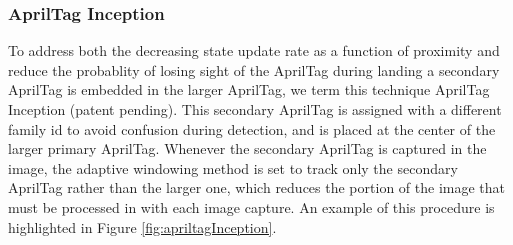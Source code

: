 \documentclass[11pt, twocolumn]{article}
\begin{document}
\subsubsection{AprilTag Inception}
To address both the decreasing state update rate as a function of proximity and reduce the probablity of losing sight of the AprilTag during landing a secondary AprilTag is embedded in the larger AprilTag, we term this technique AprilTag Inception (patent pending). This secondary AprilTag is assigned with a different family id to avoid confusion during detection, and is placed at the center of the larger primary AprilTag. Whenever the secondary AprilTag is captured in the image, the adaptive windowing method is set to track only the secondary AprilTag rather than the larger one, which reduces the portion of the image that must be processed in with each image capture. An example of this procedure is highlighted in Figure \ref{fig:apriltagInception}.
 
\end{document}
